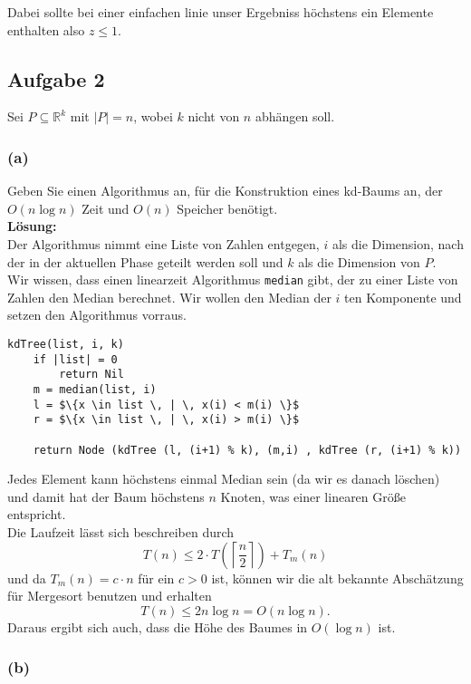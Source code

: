 \documentclass[11pt,a4paper,ngerman]{article}
\begin{document}
Dabei sollte bei einer einfachen linie unser Ergebniss höchstens ein Elemente enthalten also $z \leq 1$.

\subsection*{Aufgabe 2}

Sei $P \subseteq \mathbb{R}^k$ mit $|P| = n$, wobei $k$ nicht von $n$ abhängen soll.

\subsubsection*{(a)}

Geben Sie einen Algorithmus an, für die Konstruktion eines kd-Baums an, der $O(n \log n)$ Zeit und
$O(n)$ Speicher benötigt.\\

\textbf{Lösung:}\\

Der Algorithmus nimmt eine Liste von Zahlen entgegen, $i$ als die Dimension,
nach der in der aktuellen Phase geteilt werden soll und $k$ als die Dimension von $P$.\\
Wir wissen, dass einen linearzeit Algorithmus \lstinline|median| gibt,
der zu einer Liste von Zahlen den Median berechnet. Wir wollen den Median der $i$ ten
Komponente und setzen den Algorithmus vorraus.

\begin{lstlisting}[frame=single, mathescape = true]
kdTree(list, i, k)
    if |list| = 0 
        return Nil
    m = median(list, i)
    l = $\{x \in list \, | \, x(i) < m(i) \}$
    r = $\{x \in list \, | \, x(i) > m(i) \}$
    
    return Node (kdTree (l, (i+1) % k), (m,i) , kdTree (r, (i+1) % k))
\end{lstlisting}

Jedes Element kann höchstens einmal Median sein (da wir es danach löschen) und damit hat der
Baum höchstens $n$ Knoten, was einer linearen Größe entspricht.\\

Die Laufzeit lässt sich beschreiben durch
$$
    T(n) \leq 2 \cdot T(\left\lceil \frac{n}{2} \right\rceil) + T_m(n)
$$
und da $T_m(n) = c \cdot n$ für ein $c > 0$ ist, können wir die alt bekannte Abschätzung
für Mergesort benutzen und erhalten
$$
    T(n) \leq 2 n \log n = O(n \log n).
$$
Daraus ergibt sich auch, dass die Höhe des Baumes in $O(\log n)$ ist.

\subsubsection*{(b)}
\end{document}
